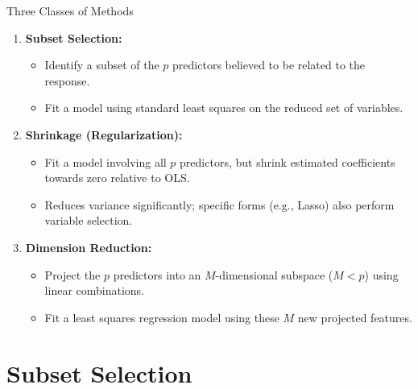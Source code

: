 \documentclass[aspectratio=169, 11pt]{beamer}
\begin{document}
\begin{frame}{Three Classes of Methods}
    \begin{enumerate}
        \item \textbf{Subset Selection:}
        \begin{itemize}
            \item Identify a subset of the $p$ predictors believed to be related to the response.
            \item Fit a model using standard least squares on the reduced set of variables.
        \end{itemize}
        \vspace{0.5em}
        \item \textbf{Shrinkage (Regularization):}
        \begin{itemize}
            \item Fit a model involving all $p$ predictors, but shrink estimated coefficients towards zero relative to OLS.
            \item Reduces variance significantly; specific forms (e.g., Lasso) also perform variable selection.
        \end{itemize}
        \vspace{0.5em}
        \item \textbf{Dimension Reduction:}
        \begin{itemize}
            \item Project the $p$ predictors into an $M$-dimensional subspace ($M < p$) using linear combinations.
            \item Fit a least squares regression model using these $M$ new projected features.
        \end{itemize}
    \end{enumerate}
\end{frame}

\section{Subset Selection}
\end{document}
